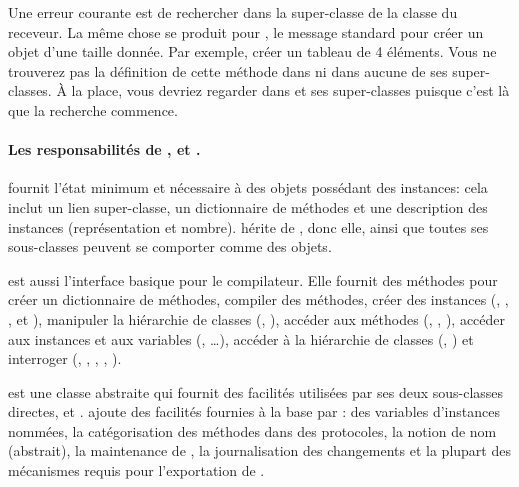 \documentclass[a4paper,10pt,twoside]{book}
\begin{document}
Une erreur courante est de rechercher  dans la super-classe de la classe du receveur.
La même chose se produit pour , le message standard pour créer un objet d'une taille donnée.
Par exemple,  créer un tableau de 4 éléments.
Vous ne trouverez pas la définition de cette méthode dans  ni 
dans
aucune de ses super-classes.
À la place, vous devriez regarder dans  et ses super-classes puisque c'est là que la recherche commence.


\paragraph{Les responsabilités de ,  et .}
 fournit l'état minimum et nécessaire à des objets possédant des instances: cela inclut un lien super-classe, un dictionnaire de méthodes et une description des instances (\ie représentation et nombre).
 hérite de , donc elle, ainsi que toutes ses sous-classes peuvent se comporter comme des objets. 

 est aussi l'interface basique pour le compilateur.
Elle fournit des méthodes pour créer un dictionnaire de méthodes, compiler des méthodes, créer des instances (\ie {}, , , et ),
manipuler la hiérarchie de classes (\ie {}, ), 
accéder aux méthodes (\ie {}, , ),
accéder aux instances et aux variables (\ie {}, \ldots),
accéder à la hiérarchie de classes (\ie {}, )
et interroger  (\ie {}, , , , ).

 est une classe abstraite qui fournit des facilités utilisées par ses deux sous-classes directes,   et .
 ajoute des facilités fournies à la base par :
des variables d'instances nommées,
la catégorisation des méthodes dans des protocoles,
la notion de nom (abstrait),
la maintenance de \changesets, la journalisation des changements
et la plupart des mécanismes requis pour l'exportation de \changesets.
\end{document}
